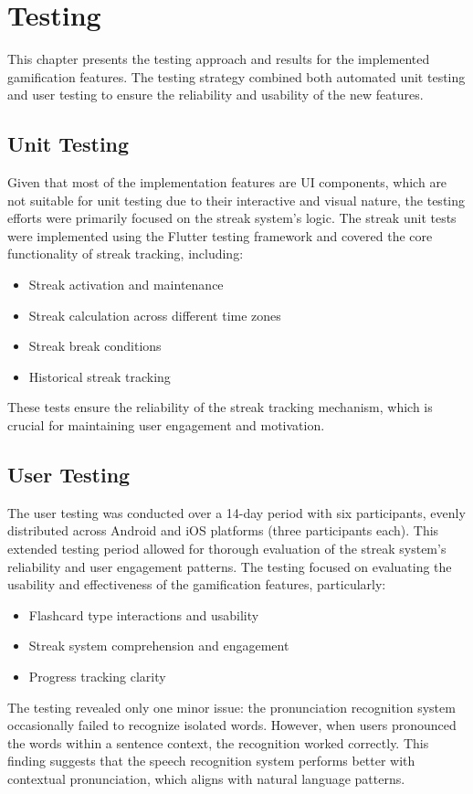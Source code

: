 \chapter{Testing}

This chapter presents the testing approach and results for the implemented gamification features. The testing strategy combined both automated unit testing and user testing to ensure the reliability and usability of the new features.

\section{Unit Testing}

Given that most of the implementation features are UI components, which are not suitable for unit testing due to their interactive and visual nature, the testing efforts were primarily focused on the streak system's logic. The streak unit tests were implemented using the Flutter testing framework and covered the core functionality of streak tracking, including:

\begin{itemize}
    \item Streak activation and maintenance
    \item Streak calculation across different time zones
    \item Streak break conditions
    \item Historical streak tracking
\end{itemize}

These tests ensure the reliability of the streak tracking mechanism, which is crucial for maintaining user engagement and motivation.

\newpage
\section{User Testing}
The user testing was conducted over a 14-day period with six participants, evenly distributed across Android and iOS platforms (three participants each). This extended testing period allowed for thorough evaluation of the streak system's reliability and user engagement patterns. The testing focused on evaluating the usability and effectiveness of the gamification features, particularly:
\begin{itemize}
    \item Flashcard type interactions and usability
    \item Streak system comprehension and engagement
    \item Progress tracking clarity
\end{itemize}
The testing revealed only one minor issue: the pronunciation recognition system occasionally failed to recognize isolated words. However, when users pronounced the words within a sentence context, the recognition worked correctly. This finding suggests that the speech recognition system performs better with contextual pronunciation, which aligns with natural language patterns.

